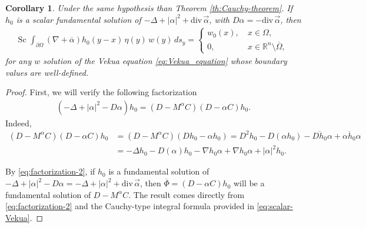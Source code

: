 \documentclass[12pt]{article}
\newcommand{\comment}[1]{\marginpar{\hfuzz=5ex
\scriptsize$\stackrel{?}{\longleftarrow}$\\\hspace*{-3ex}
{\fbox{\parbox{20ex}{\hfuzz=15ex \raggedright\sf#1 }}} }}
\newtheorem{corollary}[theorem]{Corollary}
\def\div{\mbox{div}\,}
\def\R{\mathbb{R}}
\begin{document}
\begin{corollary}\label{cor:Cauchy-fundamental}
Under the same hypothesis than Theorem \ref{th:Cauchy-theorem}. If $h_0$ is a scalar fundamental solution of $-\Delta+|\alpha|^2+\div \vec \alpha$, with $D\alpha=-\div \vec \alpha$, then
\begin{align*}
  \text{Sc }\int_{\partial\Omega} (\nabla+\overline{\alpha})h_0(y-x)\, \eta(y) \, w(y) \,ds_{y}=\left\{
   \begin{array}{ll}
      w_0(x), \ & x\in \Omega,\\
      0,           & x\in \R^n\setminus \overline{\Omega},
   \end{array}
\right.
\end{align*}
for any $w$ solution of the Vekua equation \eqref{eq:Vekua_equation} whose boundary values are well-defined.
\end{corollary}
\begin{proof}
First, we will verify the following factorization
\begin{align}\label{eq:factorization-2}
    \left(-\Delta+|\alpha|^2-D\alpha\right)h_0=(D-M^{\alpha}C)(D-\alpha C)h_0.
\end{align}
Indeed,
\begin{align*}
(D-M^{\alpha}C)(D-\alpha C)h_0&=(D-M^{\alpha}C)(Dh_0-\alpha h_0)=D^2 h_0-D(\alpha h_0)-\overline{Dh_0}\alpha+\overline{\alpha h_0}\alpha\\
&=-\Delta h_0-D(\alpha) h_0- \nabla h_0\alpha+\nabla h_0\alpha+|\alpha|^2h_0.
\end{align*}

By \eqref{eq:factorization-2}, if $h_0$ is a fundamental solution of $-\Delta+|\alpha|^2-D \alpha=-\Delta+|\alpha|^2+\div \vec \alpha$, then $\overline{\Phi}=(D-\alpha C)h_0$ will be a fundamental solution of $D-M^{\alpha}C$.
The result comes directly from \eqref{eq:factorization-2} and the Cauchy-type integral formula provided in \eqref{eq:scalar-Vekua}.
\end{proof}

\end{document}
